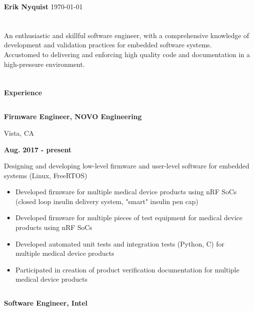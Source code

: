 \documentclass[6pt]{article}
\begin{document}
\begin{minipage}{35em}
%
%
{\selectfont \Huge \bfseries Erik Nyquist}
{\hfill \today}
\section*{}

An enthusiastic and skillful software engineer, with a comprehensive knowledge of
development and validation practices for embedded software systems. Accustomed to
delivering and enforcing high quality code and documentation in a high-pressure
environment.

\section*{}
{\selectfont \Large \bfseries Experience}

\titlerule
%
%
\subsection*{}
\begin{minipage}{20em}
{\bfseries Firmware Engineer, NOVO Engineering

Vista, CA}
\end{minipage}
\hfill
\begin{minipage}{10em}
{\bfseries Aug. 2017 - present}
\end{minipage}
\break
\break
Designing and developing low-level firmware and user-level software for embedded
systems (Linux, FreeRTOS)
\begin{itemize}
    \item Developed firmware for multiple medical device products using nRF SoCs
          (closed loop insulin delivery system, "smart" insulin pen cap)
    \item Developed firmware for multiple pieces of test equipment for medical
          device products using nRF SoCs
    \item Developed automated unit tests and integration tests (Python, C) for
          multiple medical device products
    \item Participated in creation of product verification documentation for
          multiple medical device products
\end{itemize}
\dotfill

%
%
\subsection*{}
\begin{minipage}{20em}
{\bfseries Software Engineer, Intel

}
\end{minipage}
\end{minipage}
\end{document}
